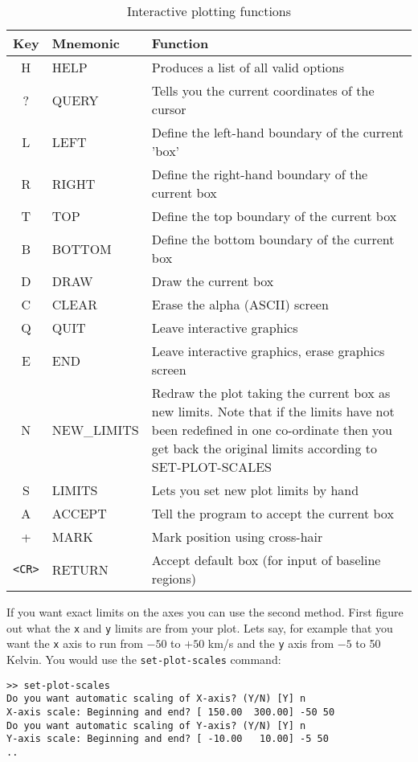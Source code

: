 \begin{table}[htbp]
\begin{center}
\caption{Interactive plotting functions}
\begin{tabular}{|c|l|l|} \hline
Key	& Mnemonic	& Function \\ \hline
H	&HELP	&Produces a list of all valid options\\
?	&QUERY	&Tells you the current coordinates of the cursor\\
L	&LEFT	&Define the left-hand boundary of the current 'box'\\
R	&RIGHT	&Define the right-hand boundary of the current box\\
T	&TOP	&Define the top boundary of the current box\\
B	&BOTTOM	&Define the bottom boundary of the current box\\
D	&DRAW	&Draw the current box\\
C	&CLEAR	&Erase the alpha (ASCII) screen\\
Q	&QUIT	&Leave interactive graphics\\
E	&END	&Leave interactive graphics, erase graphics screen\\
N	&NEW\_LIMITS    &
    \parbox[t]{3.7in}{Redraw the plot taking the current box as new
            limits. Note that if the limits have not been
            redefined in one co-ordinate then you get back the
            original limits according to SET-PLOT-SCALES}\\
S	&LIMITS	&Lets you set new plot limits by hand\\
A	&ACCEPT	&Tell the program to accept the current box\\
+	&MARK	&Mark position using cross-hair\\
\verb+<CR>+ &RETURN &Accept default box (for input of baseline regions)\\ \hline
\end{tabular}
\label{tab:specx}
\end{center}
\end{table}


If you want exact limits on the axes you can use the second
method. First figure out what the {\tt x} and {\tt y} limits are from
your plot. Lets say, for example that you want the {\tt x} axis to run
from $-50$ to $+50$ km/s and the {\tt y} axis from $-5$ to 50 Kelvin.
You would use the {\tt set-plot-scales} command:

\begin{verbatim}
>> set-plot-scales
Do you want automatic scaling of X-axis? (Y/N) [Y] n
X-axis scale: Beginning and end? [ 150.00  300.00] -50 50
Do you want automatic scaling of Y-axis? (Y/N) [Y] n
Y-axis scale: Beginning and end? [ -10.00   10.00] -5 50
..
\end{verbatim}

